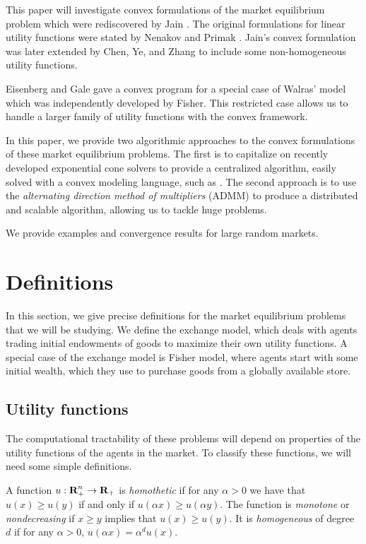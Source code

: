 \documentclass[12pt]{article}
\begin{document}
This paper will investigate convex formulations of the market
equilibrium problem which were rediscovered by Jain \cite{jain2007polynomial}.
The original formulations for linear utility functions
were stated by Nenakov and Primak \cite{nenakov1983algorithm}.
Jain's convex formulation was later extended by Chen, Ye, and Zhang \cite{chen2007note, chen2010equilibrium} to include some non-homogeneous
utility functions.

Eisenberg and Gale \cite{eisenberg1959consensus, gale1960theory, eisenberg1961aggregation} gave a convex program for a special case of Walras' model which was independently developed by Fisher. %
This restricted case allows us to handle a larger family of utility functions
with the convex framework.

In this paper, we provide two algorithmic approaches to the convex formulations of these market equilibrium problems. The first is to capitalize on recently developed exponential cone solvers \cite{scs} to provide a centralized algorithm, easily solved with a convex modeling language, such as \cite{cvxpy, cvx}. The second approach is to use the \emph{alternating direction method of multipliers} (ADMM) \cite{boyd2011distributed} to produce a distributed and scalable algorithm, allowing us to tackle huge problems.

We provide examples and convergence results for large random markets.

\section{Definitions}
In this section, we give precise definitions for the market equilibrium problems that we will be studying. We define the exchange model,
which deals with agents trading initial endowments of goods to maximize their own utility functions.
A special case of the exchange model is Fisher model, where agents
start with some initial wealth, which they use to purchase goods 
from a globally available store.

\subsection{Utility functions}
The computational tractability of these problems will depend on properties of the
utility functions of the agents in the market.
To classify these functions, we will need some simple definitions.

A function $u: {\mbox{\bf R}}^n_+ \to {\mbox{\bf R}}_+$ is \emph{homothetic} if for any $\alpha > 0$ we have that $u(x) \geq u(y)$ if and only if
$u(\alpha x) \geq u(\alpha y)$.
The function is \emph{monotone} or \emph{nondecreasing} if $x \geq y$ implies that $u(x) \geq u(y)$.
It is \emph{homogeneous} of degree $d$ if for any $\alpha > 0$,
$u(\alpha x) = \alpha^d u(x)$.
\end{document}
